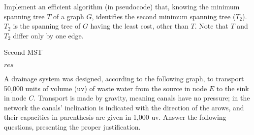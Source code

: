 {
Implement an efficient algorithm (in pseudocode) that, knowing the minimum spanning tree $T$ of a graph $G$, identifies the second minimum spanning tree ($T_2$). $T_2$ is the spanning tree of $G$ having the least cost, other than $T$. Note that $T$ and $T_2$ differ only by one edge.

\ansseparator

\begin{algorithm}[H]
    \caption{Second MST}
    \begin{algorithmic}[1]
                 
                 
                 
                 
                    \EndIf
                \EndFor
            \EndFor
            \State \Return $res$
        \EndFunction
    \end{algorithmic}
\end{algorithm}

A drainage system was designed, according to the following graph, to transport 50,000 units of volume (uv) of waste water from the source in node $E$ to the sink in node $C$. Transport is made by gravity, meaning canals have no pressure; in the network the canals' inclination is indicated with the direction of the arows, and their capacities in parenthesis are given in 1,000 uv. Answer the following questions, presenting the proper justification.

\begin{center}
\end{center}}

